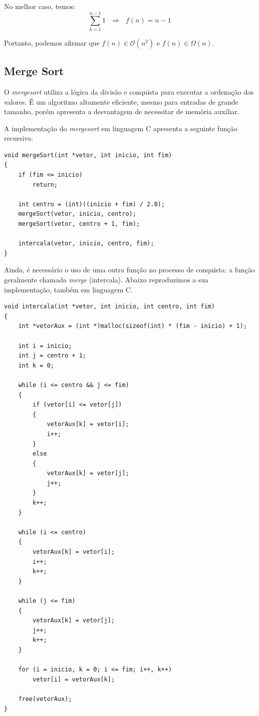 \documentclass[fontsize=10pt]{article}
\begin{document}
\quad No melhor caso, temos:
\begin{equation}
    \sum_{k=1}^{n-1} 1 \ \ \ \Longrightarrow \ \ \ f(n) = n - 1
\end{equation}

\quad Portanto, podemos afirmar que $f(n) \in \mathcal{O}(n^2)$ e $f(n) \in \Omega(n)$.

\subsection{Merge Sort}

\quad O \textit{mergesort} utiliza a lógica da divisão e conquista para executar a ordenação dos valores. É um algoritmo altamente eficiente, mesmo para entradas de grande tamanho, porém apresenta a desvantagem de necessitar de memória auxiliar.

\quad A implementação do \textit{mergesort} em linguagem C apresenta a seguinte função recursiva:

\begin{lstlisting}
void mergeSort(int *vetor, int inicio, int fim)
{
    if (fim <= inicio)
        return;

    int centro = (int)((inicio + fim) / 2.0);
    mergeSort(vetor, inicio, centro);
    mergeSort(vetor, centro + 1, fim);

    intercala(vetor, inicio, centro, fim);
}
\end{lstlisting}

\quad Ainda, é necessário o uso de uma outra função no processo de conquista: a função geralmente chamada \textit{merge} (intercala). Abaixo reproduzimos a sua implementação, também em linguagem C.

\begin{lstlisting}
void intercala(int *vetor, int inicio, int centro, int fim)
{
    int *vetorAux = (int *)malloc(sizeof(int) * (fim - inicio) + 1);

    int i = inicio;
    int j = centro + 1;
    int k = 0;

    while (i <= centro && j <= fim)
    {
        if (vetor[i] <= vetor[j])
        {
            vetorAux[k] = vetor[i];
            i++;
        }
        else
        {
            vetorAux[k] = vetor[j];
            j++;
        }
        k++;
    }

    while (i <= centro)
    {
        vetorAux[k] = vetor[i];
        i++;
        k++;
    }

    while (j <= fim)
    {
        vetorAux[k] = vetor[j];
        j++;
        k++;
    }

    for (i = inicio, k = 0; i <= fim; i++, k++)
        vetor[i] = vetorAux[k];

    free(vetorAux);
}
\end{lstlisting}
\end{document}
